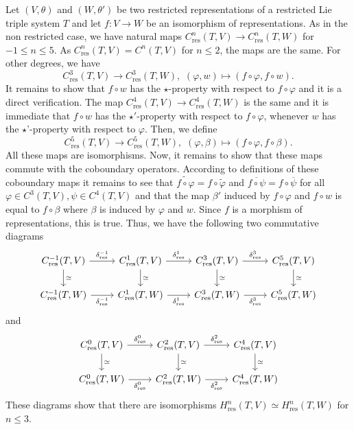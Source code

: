 \documentclass[11pt, twoside]{article}
\begin{document}
Let $(V,\theta)$ and $(W,\theta') $ be two restricted representations of a restricted Lie triple system $T$ and let $f:V\to W $ be an isomorphism of representations. As in the non restricted case, we have natural maps $C^n_\mathrm{res}(T,V)\to C^n_\mathrm{res}(T,W) $ for $-1\leq n\leq 5$. As $C^n_\mathrm{res}(T,V)=C^n(T,V) $ for $n\leq 2$, the maps are the same. For  other degrees, we have $$C^3_\mathrm{res}(T,V)\to C^3_\mathrm{res}(T,W), \,\, (\varphi,w)\mapsto (f\circ \varphi,f\circ w). $$ It remains to show that $f\circ w $ has the $\star$-property with respect to $f\circ \varphi$ and it is a direct verification. The map $C^4_\mathrm{res}(T,V)\to C^4_\mathrm{res}(T,W)$ is the same and it is immediate that $f\circ w$ has the $\star'$-property with respect to $f\circ \varphi$, whenever $w$ has the $\star$'-property with respect to $\varphi$. Then, we define $$C^5_\mathrm{res}(T,V)\to C^5_\mathrm{res}(T,W), \,\, (\varphi,\beta)\mapsto (f\circ \varphi,f\circ \beta). $$ All these maps are isomorphisms. Now, it remains to show that these maps commute with the coboundary operators. According to definitions of these coboundary maps it remains to see that $\widetilde{f\circ \varphi}= f\circ \tilde{\varphi} $ and $\overline{f\circ \psi}= f\circ \overline{\psi} $ for all $\varphi\in C^3(T,V),\psi\in C^4(T,V) $ and that the map $\beta'$ induced by $f\circ \varphi $ and $f\circ w $ is equal to $f\circ\beta$ where $\beta$ is induced by $ \varphi $ and $w $. Since $f$ is a morphism of representations, this is true. Thus, we have the following two commutative diagrams \[\begin{tikzcd}
	{C^{-1}_\mathrm{res}(T,V)} & {C^{1}_\mathrm{res}(T,V)} & {C^{3}_\mathrm{res}(T,V)} & {C^{5}_\mathrm{res}(T,V)} \\
	{C^{-1}_\mathrm{res}(T,W)} & {C^{1}_\mathrm{res}(T,W)} & {C^{3}_\mathrm{res}(T,W)} & {C^{5}_\mathrm{res}(T,W)}
	\arrow["{\delta^{-1}_\mathrm{res}}", from=1-1, to=1-2]
	\arrow["\simeq", from=1-1, to=2-1]
	\arrow["{\delta^{1}_\mathrm{res}}", from=1-2, to=1-3]
	\arrow["\simeq", from=1-2, to=2-2]
	\arrow["{\delta^{3}_\mathrm{res}}", from=1-3, to=1-4]
	\arrow["\simeq", from=1-3, to=2-3]
	\arrow["\simeq", from=1-4, to=2-4]
	\arrow["{\delta^{-1}_\mathrm{res}}"', from=2-1, to=2-2]
	\arrow["{\delta^{1}_\mathrm{res}}"', from=2-2, to=2-3]
	\arrow["{\delta^{3}_\mathrm{res}}"', from=2-3, to=2-4]
\end{tikzcd}\] and \[\begin{tikzcd}
	{C^{0}_\mathrm{res}(T,V)} & {C^{2}_\mathrm{res}(T,V)} & {C^{4}_\mathrm{res}(T,V)} \\
	{C^{0}_\mathrm{res}(T,W)} & {C^{2}_\mathrm{res}(T,W)} & {C^{4}_\mathrm{res}(T,W)}
	\arrow["{\delta^{0}_\mathrm{res}}", from=1-1, to=1-2]
	\arrow["\simeq", from=1-1, to=2-1]
	\arrow["{\delta^{2}_\mathrm{res}}", from=1-2, to=1-3]
	\arrow["\simeq", from=1-2, to=2-2]
	\arrow["\simeq", from=1-3, to=2-3]
	\arrow["{\delta^{0}_\mathrm{res}}"', from=2-1, to=2-2]
	\arrow["{\delta^{2}_\mathrm{res}}"', from=2-2, to=2-3]
\end{tikzcd}\] These diagrams show that there are isomorphisms $H^n_\mathrm{res}(T,V)\simeq H^n_\mathrm{res}(T,W) $ for $n\leq 3$.
\end{document}
